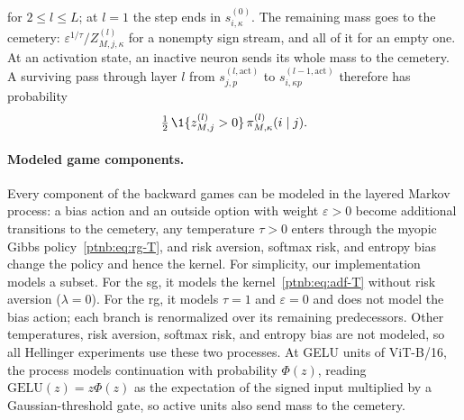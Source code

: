 for $2\le l\le L$; at $l=1$ the step ends in $s^{(0)}_{i,\kappa}$. The remaining mass goes to the cemetery: $\varepsilon^{1/\tau}/Z^{(l)}_{M,j,\kappa}$ for a nonempty sign stream, and all of it for an empty one. At an activation state, an inactive neuron sends its whole mass to the cemetery. A surviving pass through layer $l$ from $s^{(l,\mathrm{act})}_{j,p}$ to $s^{(l-1,\mathrm{act})}_{i,\kappa p}$ therefore has probability
\begin{equation}\label{ptnb:eq:rg-T-act}
 \tfrac12\,\1\{z_{M,j}^{(l)}>0\}\,\pi^{(l)}_{M,\kappa}(i\mid j).
\end{equation}

\paragraph{Modeled game components.}
Every component of the backward games can be modeled in the layered Markov process: a bias action and an outside option with weight $\varepsilon>0$ become additional transitions to the cemetery, any temperature $\tau>0$ enters through the myopic Gibbs policy~\eqref{ptnb:eq:rg-T}, and risk aversion, softmax risk, and entropy bias change the policy and hence the kernel. For simplicity, our implementation models a subset. For the \ac{sg}, it models the kernel~\eqref{ptnb:eq:adf-T} without risk aversion ($\lambda=0$). For the \ac{rg}, it models $\tau=1$ and $\varepsilon=0$ and does not model the bias action; each branch is renormalized over its remaining predecessors. Other temperatures, risk aversion, softmax risk, and entropy bias are not modeled, so all Hellinger experiments use these two processes. At GELU units of ViT-B/16, the process models continuation with probability $\Phi(z)$, reading $\mathrm{GELU}(z)=z\Phi(z)$ as the expectation of the signed input multiplied by a Gaussian-threshold gate, so active units also send mass to the cemetery.

